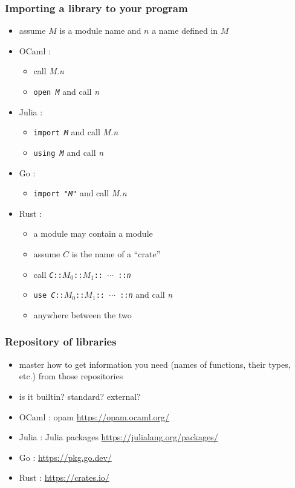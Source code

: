 \documentclass[12pt,dvipdfmx]{beamer}
\newcommand{\ao}[1]{{\color{blue}#1}}
\begin{document}
\begin{frame}
  \frametitle{Importing a library to your program}
  \begin{itemize}
  \item assume $M$ is a module name and $n$ a name defined in $M$
  \item OCaml :
    \begin{itemize}
    \item call {\it M.n} 
    \item {\tt \ao{open} {\it M}} and call {\it n}
    \end{itemize}
    
  \item Julia : 
    \begin{itemize}
    \item {\tt \ao{import} {\it M}} and call {\it M.n} 
    \item {\tt \ao{using} {\it M}} and call {\it n}
    \end{itemize}

  \item Go :
    \begin{itemize}
    \item {\tt \ao{import} "{\it M}"} and call {\it M.n} 
    \end{itemize}

  \item Rust :
    \begin{itemize}
    \item a module may contain a module
    \item assume $C$ is the name of a ``crate''
    \item call {\tt {\it C}::$M_0$::$M_1$:: $\cdots$ ::{\it n}}
    \item {\tt \ao{use} {\it C}::$M_0$::$M_1$:: $\cdots$ ::{\it n}}
      and call \ao{\it n} 
    \item anywhere between the two
    \end{itemize}
  \end{itemize}
\end{frame}

\begin{frame}
  \frametitle{Repository of libraries}
  \begin{itemize}
  \item master how to get information you need
    (names of functions, their types, etc.) from those repositories
  \item is it builtin? standard? external?
  \end{itemize}
  
  \begin{itemize}
  \item OCaml : opam \url{https://opam.ocaml.org/}
  \item Julia : Julia packages \url{https://julialang.org/packages/}
  \item Go : \url{https://pkg.go.dev/}
  \item Rust : \url{https://crates.io/}
  \end{itemize}
\end{frame}
\end{document}
